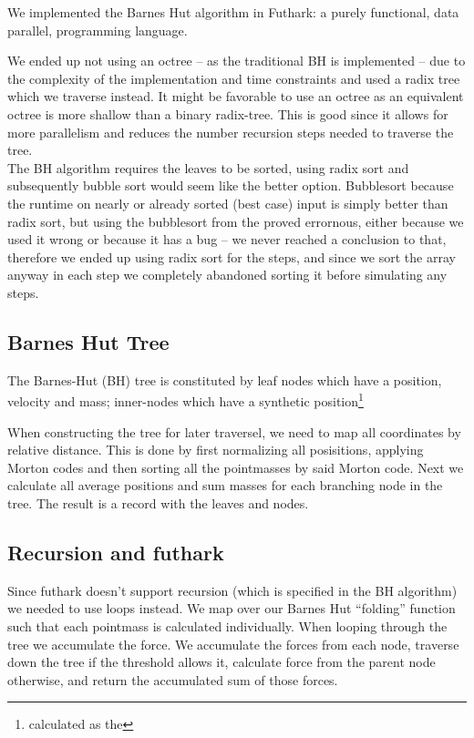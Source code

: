 We implemented the Barnes Hut algorithm in
Futhark\cite{futhark}: a purely functional,
data parallel, programming language.

We ended up not using an octree -- as the traditional BH is implemented -- due
to the complexity of the implementation and time constraints and used a radix
tree which we traverse instead. It might be favorable to use an octree as an
equivalent octree is more shallow than a binary radix-tree. This is good since
it allows for more parallelism and reduces the number recursion steps needed to
traverse the tree.\\

\noindent
The BH algorithm requires the leaves to be sorted, using radix sort and
subsequently bubble sort would seem like the better option. Bubblesort because
the runtime on nearly or already sorted (best case) input is simply better than
radix sort, but using the bubblesort from the
proved errornous, either because we used it wrong or because it has a bug -- we
never reached a conclusion to that, therefore we ended up using radix sort for
the steps, and since we sort the array anyway in each step we completely
abandoned sorting it before simulating any steps.

\subsection{Barnes Hut Tree}
The Barnes-Hut (BH) tree is constituted by leaf nodes which have a position,
velocity and mass; inner-nodes which have a synthetic
position\footnote{calculated as the}


When constructing the tree for later traversel, we need to map all coordinates
by relative distance. This is done by first normalizing all posisitions,
applying Morton codes and then sorting all the pointmasses by said Morton code.
Next we calculate all average positions and sum masses for each branching node
in the tree. The result is a record with the leaves and nodes.

\subsection{Recursion and futhark}
Since futhark doesn't support recursion (which is specified in the BH algorithm)
we needed to use loops instead. We map over our Barnes Hut ``folding'' function
such that each pointmass is calculated individually. When looping through the
tree we accumulate the force. We accumulate the forces from each node, traverse
down the tree if the threshold allows it, calculate force from the parent node
otherwise, and return the accumulated sum of those forces.

